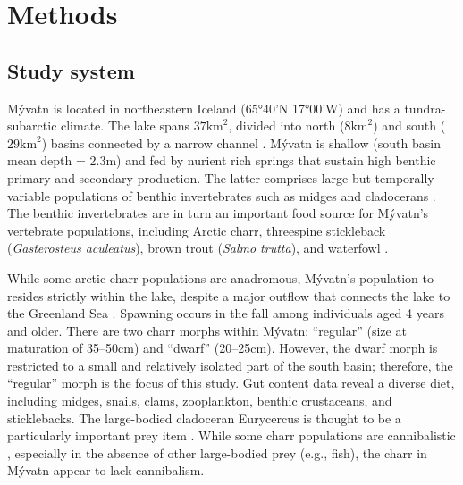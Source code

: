 \section*{Methods} 

\subsection*{Study system} 

M\'{y}vatn is located in northeastern Iceland (65°40’N 17°00’W) 
and has a tundra-subarctic climate. 
The lake spans $37 \text{km}^2$, 
divided into north ($8 \text{km}^2$) and south ($29 \text{km}^2$) basins 
connected by a narrow channel \citep{einarsson2004myvatn}. 
M\'{y}vatn is shallow (south basin mean depth = 2.3m) and 
fed by nurient rich springs that sustain high benthic primary and secondary production.
The latter comprises large but temporally variable populations of benthic invertebrates 
such as midges and cladocerans \citep{einarsson2004clad, gardarsson2004population}.
The benthic invertebrates are in turn 
an important food source for M\'{y}vatn’s vertebrate populations, 
including Arctic charr, threespine stickleback (\emph{Gasterosteus aculeatus}), 
brown trout (\emph{Salmo trutta}), and waterfowl \citep{einarsson2004myvatn}. 

While some arctic charr populations are anadromous, 
M\'{y}vatn’s population to resides strictly within the lake, 
despite a major outflow that connects the lake to the Greenland Sea \citep{gudbergsson2004}. 
Spawning occurs in the fall among individuals aged 4 years and older. 
There are two charr morphs within M\'{y}vatn: ``regular'' (size at maturation of 35--50cm) 
and ``dwarf'' (20--25cm). However, the dwarf morph is restricted to a small 
and relatively isolated part of the south basin; therefore, 
the ``regular'' morph is the focus of this study. 
Gut content data reveal a diverse diet, including midges, snails, clams, zooplankton, 
benthic crustaceans, and sticklebacks. 
The large-bodied cladoceran Eurycercus is thought to be a particularly important prey item 
\citep{gudbergsson2004}. 
While some charr populations are cannibalistic \citep{klemetsen2003atlantic}, 
especially in the absence of other large-bodied prey (e.g., fish), 
the charr in M\'{y}vatn appear to lack cannibalism. 

